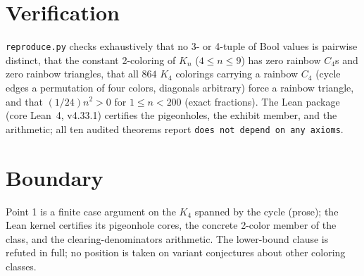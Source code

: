 \documentclass[11pt]{article}
\begin{document}
\section{Verification}

\texttt{reproduce.py} checks exhaustively that no 3- or 4-tuple of
Bool values is pairwise distinct, that the constant 2-coloring of
$K_n$ ($4 \le n \le 9$) has zero rainbow $C_4$s and zero rainbow
triangles, that all $864$ $K_4$ colorings carrying a rainbow $C_4$
(cycle edges a permutation of four colors, diagonals arbitrary) force
a rainbow triangle, and that $(1/24)n^2 > 0$ for $1 \le n < 200$
(exact fractions). The Lean package (core Lean~4, v4.33.1) certifies
the pigeonholes, the exhibit member, and the arithmetic; all ten
audited theorems report \texttt{does not depend on any axioms}.

\section{Boundary}

Point 1 is a finite case argument on the $K_4$ spanned by the cycle
(prose); the Lean kernel certifies its pigeonhole cores, the concrete
2-color member of the class, and the clearing-denominators arithmetic.
The lower-bound clause is refuted in full; no position is taken on
variant conjectures about other coloring classes.
\end{document}
